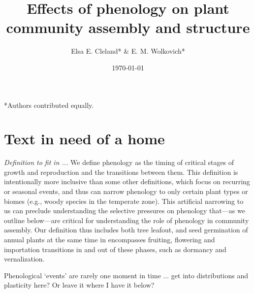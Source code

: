 \documentclass[11pt]{article}
\begin{document}

\renewcommand{\refname}{\CHead{}}

\title{Effects of phenology on plant community assembly and structure }
\author{Elsa E. Cleland* \& E. M. Wolkovich*}
\date{\today}
\maketitle
\tableofcontents


\setlength{\parindent}{0cm}
\setlength{\parskip}{5pt}
*Authors contributed equally.




\section{Text in need of a home}

\emph{Definition to fit in ...} 
We define phenology as the timing of critical stages of growth and reproduction and the transitions between them. This definition is intentionally more inclusive than some other definitions, which focus on recurring or seasonal events, and thus can narrow phenology to only certain plant types or biomes (e.g., woody species in the temperate zone). This artificial narrowing to us can preclude understanding the selective pressures on phenology that---as we outline below---are critical for understanding the role of phenology in community assembly. Our definition thus includes both tree leafout, and seed germination of annual plants at the same time in encompasses fruiting, flowering and importation transitions in and out of these phases, such as dormancy and vernalization.

Phenological `events' are rarely one moment in time ... get into distributions and plasticity here? Or leave it where I have it below?
\end{document}
